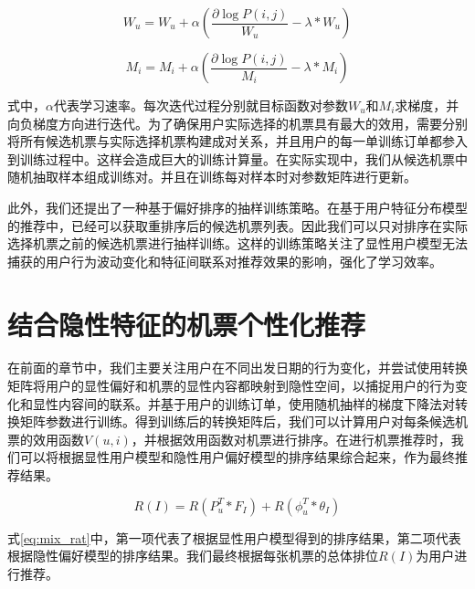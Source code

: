 \begin{equation}
	W_u = W_u + \alpha(\frac{\partial \log P(i,j)}{W_u} - \lambda*W_u)
\end{equation}

\begin{equation}
	M_i = M_i + \alpha(\frac{\partial \log P(i,j)}{M_i} - \lambda*M_i)
\end{equation}

式中，$\alpha$代表学习速率。每次迭代过程分别就目标函数对参数$W_u$和$M_i$求梯度，并向负梯度方向进行迭代。为了确保用户实际选择的机票具有最大的效用，需要分别将所有候选机票与实际选择机票构建成对关系，并且用户的每一单训练订单都参入到训练过程中。这样会造成巨大的训练计算量。在实际实现中，我们从候选机票中随机抽取样本组成训练对。并且在训练每对样本时对参数矩阵进行更新。

此外，我们还提出了一种基于偏好排序的抽样训练策略。在基于用户特征分布模型的推荐中，已经可以获取重排序后的候选机票列表。因此我们可以只对排序在实际选择机票之前的候选机票进行抽样训练。这样的训练策略关注了显性用户模型无法捕获的用户行为波动变化和特征间联系对推荐效果的影响，强化了学习效率。

\section{结合隐性特征的机票个性化推荐}

在前面的章节中，我们主要关注用户在不同出发日期的行为变化，并尝试使用转换矩阵将用户的显性偏好和机票的显性内容都映射到隐性空间，以捕捉用户的行为变化和显性内容间的联系。并基于用户的训练订单，使用随机抽样的梯度下降法对转换矩阵参数进行训练。得到训练后的转换矩阵后，我们可以计算用户对每条候选机票的效用函数$V(u,i)$，并根据效用函数对机票进行排序。在进行机票推荐时，我们可以将根据显性用户模型和隐性用户偏好模型的排序结果综合起来，作为最终推荐结果。

\begin{equation}
\label{eq:mix_rat}
	R(I) = R(P_u^T * F_I) + R(\phi_u^T * \theta_I)
\end{equation}

式\ref{eq:mix_rat}中，第一项代表了根据显性用户模型得到的排序结果，第二项代表根据隐性偏好模型的排序结果。我们最终根据每张机票的总体排位$R(I)$为用户进行推荐。

